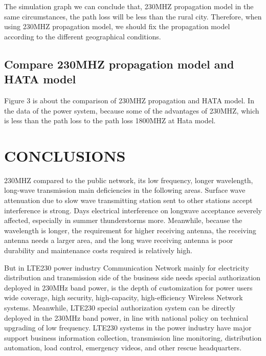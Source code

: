 \documentclass[runningheads,a4paper]{llncs}
\begin{document}
{The simulation graph we can conclude that, 230MHZ propagation model in the same circumstances, the path loss will be less than the rural city. Therefore, when using 230MHZ propagation model, we should fix the propagation model according to  the different geographical conditions.


\subsection{Compare 230MHZ propagation model and HATA model}

Figure 3 is about  the comparison of 230MHZ propagation and HATA model. In the data of the power system, because some of the advantages of 230MHZ, which is less than the path loss to the path loss 1800MHZ at Hata model.





\section{CONCLUSIONS}

230MHZ compared to the public network, its low frequency, longer wavelength, long-wave transmission main deficiencies in the following areas. Surface wave attenuation due to slow wave transmitting station sent to other stations accept interference is strong. Days electrical interference on longwave acceptance severely affected, especially in summer thunderstorms more. Meanwhile, because the wavelength is longer, the requirement for higher receiving antenna, the receiving antenna needs a larger area, and the long wave receiving antenna is poor durability and maintenance costs required is relatively high.

But in LTE230 power industry Communication Network mainly for electricity distribution and transmission side of the business side needs special authorization deployed in 230MHz band power, is the depth of customization for power users wide coverage, high security, high-capacity, high-efficiency Wireless Network systems. Meanwhile, LTE230 special authorization system can be directly deployed in the 230MHz band power, in line with national policy on technical upgrading of low frequency. LTE230 systems in the power industry have major support business information collection, transmission line monitoring, distribution automation, load control, emergency videos, and other rescue headquarters. 

}
\end{document}

